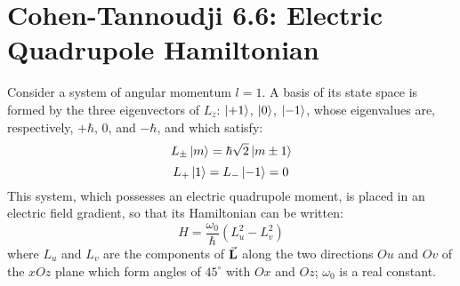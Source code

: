 \documentclass[a4paper,twoside]{article}
\begin{document}
\section*{Cohen-Tannoudji 6.6: Electric Quadrupole Hamiltonian}
Consider a system of angular momentum $ l=1 $. A basis of its state space is formed by the three eigenvectors of $ L_z $: $\ket{+1} $, $\ket{0} $, $\ket{-1} $, whose eigenvalues are, respectively, $ + \hbar $, $ 0 $, and $ - \hbar $, and which satisfy:
\begin{equation}
    L_{\pm}\ket{m} = \hbar \sqrt{2}\ket{m \pm 1}
\end{equation}
\begin{equation}
    L_+\ket{1} = L_-\ket{-1} = 0
\end{equation}
This system, which possesses an electric quadrupole moment, is placed in an electric field gradient, so that its Hamiltonian can be written:
\begin{equation}
    H = \frac{\omega_0}{\hbar} (L_u^2 - L_v^2)
\end{equation}
where $ L_u $ and $ L_v $ are the components of $ \va{L} $ along the two directions $ Ou $ and $ Ov $ of the $ xOz $ plane which form angles of $ 45^\circ $ with $ Ox $ and $ Oz $; $ \omega_0 $ is a real constant.
\end{document}
